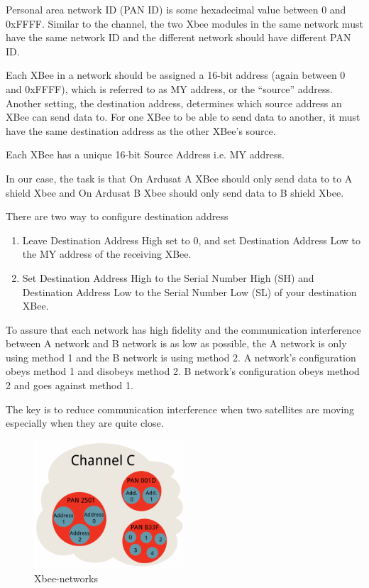 Personal area network ID (PAN ID) is some hexadecimal value between 0 and 0xFFFF. Similar to the channel, the two Xbee modules in the same network must have the same network ID and the different network should have different PAN ID.

 Each XBee in a network should be assigned a 16-bit address (again between 0 and 0xFFFF), which is referred to as MY address, or the “source” address. Another setting, the destination address, determines which source address an XBee can send data to. For one XBee to be able to send data to another, it must have the same destination address as the other XBee's source.

Each XBee has a unique 16-bit Source Address i.e. MY address.

In our case, the task is that On Ardusat A XBee should only send data to to A shield Xbee and On Ardusat B Xbee should only send data to B shield Xbee.

There are two way to configure destination address
\begin{enumerate}
\item Leave Destination Address High set to 0, and set Destination Address Low to the MY address of the receiving XBee.

\item Set Destination Address High to the Serial Number High (SH) and Destination Address Low to the Serial Number Low (SL) of your destination XBee.
\end{enumerate}
To assure that each network has high fidelity and the communication interference between A network and B network is as low as possible, the A network is only using method 1 and the B network is using method 2. A network's configuration obeys method 1 and disobeys method 2. B network's configuration obeys method 2 and goes against method 1.

The key is to reduce communication interference when two satellites are moving especially when they are quite close.

\begin{figure}[ht]
\centering
\includegraphics[width=0.5\textwidth]{fig/DOE/Network}
\caption{Xbee-networks}
\end{figure}

